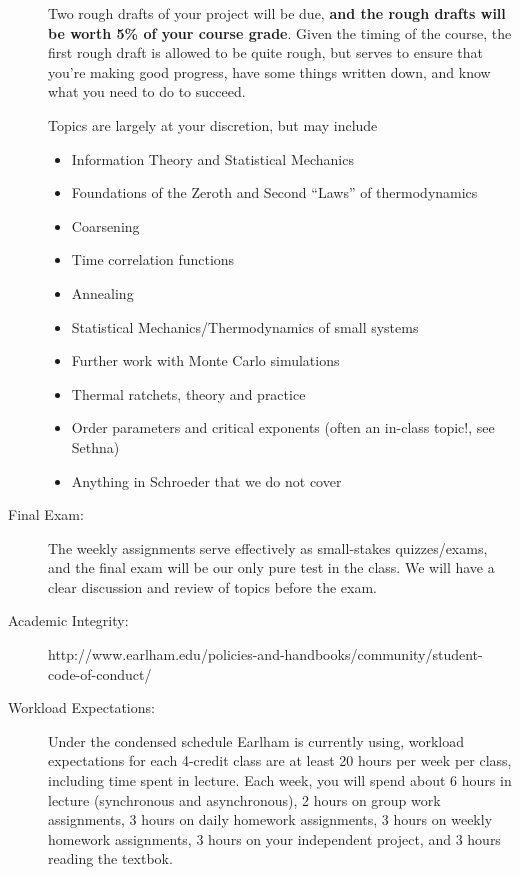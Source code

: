 \documentclass[12pt]{article}
\begin{document}
\begin{description}
Two rough drafts of your project will be due, \textbf{and the rough drafts will be worth 5\% of your course grade}. Given the timing of the course, the first rough draft is allowed to be quite rough, but serves to ensure that you're making good progress, have some things written down, and know what you need to do to succeed.

Topics are largely at your discretion, but may include

\begin{itemize}
  \item Information Theory and Statistical Mechanics
  \item Foundations of the Zeroth and Second ``Laws'' of
    thermodynamics
  \item Coarsening
  \item Time correlation functions
   \item Annealing
  \item Statistical Mechanics/Thermodynamics of small systems
  \item Further work with Monte Carlo simulations
  \item Thermal ratchets, theory and practice
  \item Order parameters and critical exponents (often an in-class
    topic!, see Sethna)
    \item Anything in Schroeder that we do not cover
    \end{itemize}

    \item[Final Exam:] The weekly assignments serve effectively as small-stakes quizzes/exams, and the final exam will be our only pure test in the class. We will have a clear discussion and review of topics before the exam.

    \item[Academic Integrity:] {\small http://www.earlham.edu/policies-and-handbooks/community/student-code-of-conduct/}

      \item[Workload Expectations:] Under the condensed schedule Earlham is currently using, workload expectations for each 4-credit class are at least 20 hours per week per class, including time spent in lecture. Each week, you will spend about 6 hours in lecture (synchronous and asynchronous), 2 hours on group work assignments, 3 hours on daily homework assignments, 3 hours on weekly homework assignments, 3 hours on your independent project, and 3 hours reading the textbok.


\end{description}
\end{document}
